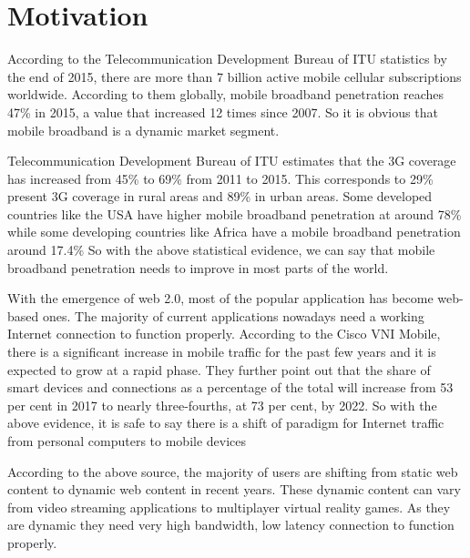 \vspace{12pt}
\clearpage



\section{Motivation}



\vspace{12pt}

According to the Telecommunication Development Bureau of ITU statistics \cite{no_of_mobile_devices_ICTFacts} by the end of 2015, there are more than 7 billion active mobile cellular subscriptions worldwide. According to them globally, mobile broadband penetration reaches 47\% in 2015, a value that increased 12 times since 2007. So it is obvious that mobile broadband is a dynamic market segment. 

\vspace{12pt}


Telecommunication Development Bureau of ITU estimates that the 3G coverage has increased from 45\% to 69\% from 2011 to 2015. This corresponds to 29\% present 3G coverage in rural areas and 89\% in urban areas. Some developed countries like the USA have higher mobile broadband penetration at around 78\% while some developing countries like Africa have a mobile broadband penetration around 17.4\% So with the above statistical evidence, we can say that mobile broadband penetration needs to improve in most parts of the world.

\vspace{12pt}


With the emergence of web 2.0, most of the popular application has become web-based ones. The majority of current applications nowadays need a working Internet connection to function properly.  According to the Cisco VNI Mobile\cite{mobile_web_penetration}, there is a significant increase in mobile traffic for the past few years and it is expected to grow at a rapid phase. They further point out that the share of smart devices and connections as a percentage of the total will increase from 53 per cent in 2017 to nearly three-fourths, at 73 per cent, by 2022. So with the above evidence, it is safe to say there is a shift of paradigm for Internet    traffic from personal computers to mobile devices 

\vspace{12pt}


According to the above source\cite{mobile_web_penetration}, the majority of users are shifting from static web content to dynamic web content in recent years. These dynamic content can vary from video streaming applications to multiplayer virtual reality games. As they are dynamic they need very high bandwidth, low latency connection to function properly.

